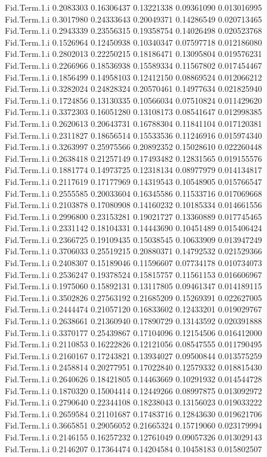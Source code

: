 \documentclass[11pt]{article} %
\begin{document}
\begin{Schunk}
\begin{Soutput}
Fid.Term.1.i 0.2083303 0.16306437 0.13221338 0.09361090 0.013016995
Fid.Term.1.i 0.3017980 0.24333643 0.20049371 0.14286549 0.020713465
Fid.Term.1.i 0.2943339 0.23556315 0.19358754 0.14026498 0.020523768
Fid.Term.1.i 0.1526964 0.12450938 0.10340347 0.07597718 0.012186080
Fid.Term.1.i 0.2802013 0.22250215 0.18186471 0.13095804 0.019576231
Fid.Term.1.i 0.2266966 0.18536938 0.15589334 0.11567802 0.017454467
Fid.Term.1.i 0.1856499 0.14958103 0.12412150 0.08869524 0.012066212
Fid.Term.1.i 0.3282024 0.24828324 0.20570461 0.14977634 0.021825940
Fid.Term.1.i 0.1724856 0.13130335 0.10566034 0.07510824 0.011429620
Fid.Term.1.i 0.3372303 0.16051280 0.13108173 0.08541647 0.012998385
Fid.Term.1.i 0.2620613 0.20643731 0.16788304 0.11841104 0.017120381
Fid.Term.1.i 0.2311827 0.18656514 0.15533536 0.11246916 0.015974340
Fid.Term.1.i 0.3263997 0.25975566 0.20892352 0.15028610 0.022260448
Fid.Term.1.i 0.2638418 0.21257149 0.17493482 0.12831565 0.019155576
Fid.Term.1.i 0.1881774 0.14973725 0.12318134 0.08977979 0.014134817
Fid.Term.1.i 0.2117619 0.17177969 0.14319543 0.10548905 0.015766547
Fid.Term.1.i 0.2555585 0.20033604 0.16345586 0.11533716 0.017069668
Fid.Term.1.i 0.2103878 0.17080908 0.14160232 0.10185334 0.014661556
Fid.Term.1.i 0.2996800 0.23153281 0.19021727 0.13360889 0.017745465
Fid.Term.1.i 0.2331142 0.18104331 0.14443690 0.10451489 0.015406424
Fid.Term.1.i 0.2366725 0.19109435 0.15038545 0.10633909 0.013947249
Fid.Term.1.i 0.3706033 0.25519215 0.20880371 0.14792532 0.021529366
Fid.Term.1.i 0.2408307 0.15189046 0.11596607 0.07734178 0.010734073
Fid.Term.1.i 0.2536247 0.19378524 0.15815757 0.11561153 0.016606967
Fid.Term.1.i 0.1975060 0.15892131 0.13117805 0.09461347 0.014189115
Fid.Term.1.i 0.3502826 0.27563192 0.21685209 0.15269391 0.022627005
Fid.Term.1.i 0.2444474 0.21057120 0.16833602 0.12433201 0.019029767
Fid.Term.1.i 0.2638661 0.21360940 0.17890729 0.13143592 0.020391888
Fid.Term.1.i 0.3370177 0.25439867 0.17104096 0.12154506 0.016412000
Fid.Term.1.i 0.2110853 0.16222826 0.12121056 0.08547555 0.011790495
Fid.Term.1.i 0.2160167 0.17243821 0.13934027 0.09500844 0.013575259
Fid.Term.1.i 0.2458814 0.20277951 0.17022840 0.12579332 0.018815430
Fid.Term.1.i 0.2640626 0.18421805 0.14463669 0.10291932 0.014544728
Fid.Term.1.i 0.1870320 0.15004414 0.12449266 0.08997875 0.013092972
Fid.Term.1.i 0.2790640 0.22344108 0.18238043 0.13156023 0.019033222
Fid.Term.1.i 0.2659584 0.21101687 0.17483716 0.12843630 0.019621706
Fid.Term.1.i 0.3665851 0.29056052 0.21665324 0.15719060 0.023179994
Fid.Term.1.i 0.2146155 0.16257232 0.12761049 0.09057326 0.013029143
Fid.Term.1.i 0.2146207 0.17364474 0.14204584 0.10458183 0.015802507

\end{Soutput}
\end{Schunk}
\end{document}

